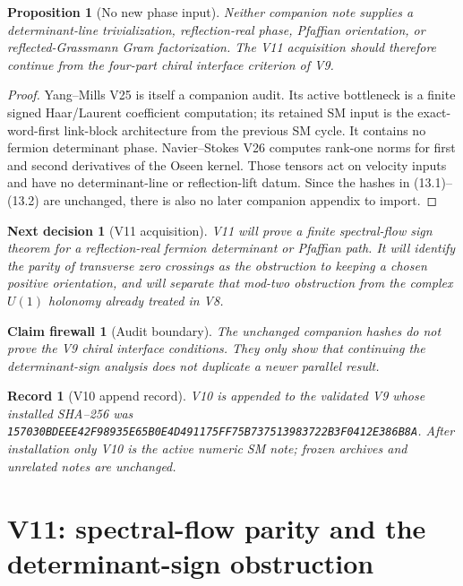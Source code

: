 \documentclass[11pt]{article}
\newtheorem{proposition}[theorem]{Proposition}
\newtheorem{firewall}[theorem]{Claim firewall}
\newtheorem{decision}[theorem]{Next decision}
\newtheorem{record}[theorem]{Record}
\theoremstyle{remark}
\begin{document}
\begin{proposition}[No new phase input]
\label{prop:v19v10-no-input}
Neither companion note supplies a determinant-line trivialization,
reflection-real phase, Pfaffian orientation, or reflected-Grassmann Gram
factorization.  The V11 acquisition should therefore continue from the
four-part chiral interface criterion of V9.
\end{proposition}

\begin{proof}
Yang--Mills V25 is itself a companion audit.  Its active bottleneck is a
finite signed Haar/Laurent coefficient computation; its retained SM input
is the exact-word-first link-block architecture from the previous SM
cycle.  It contains no fermion determinant phase.  Navier--Stokes V26
computes rank-one norms for first and second derivatives of the Oseen
kernel.  Those tensors act on velocity inputs and have no determinant-line
or reflection-lift datum.  Since the hashes in (13.1)--(13.2) are
unchanged, there is also no later companion appendix to import.
\end{proof}

\begin{decision}[V11 acquisition]
\label{dec:v19v10-next}
V11 will prove a finite spectral-flow sign theorem for a reflection-real
fermion determinant or Pfaffian path.  It will identify the parity of
transverse zero crossings as the obstruction to keeping a chosen positive
orientation, and will separate that mod-two obstruction from the complex
\(U(1)\) holonomy already treated in V8.
\end{decision}

\begin{firewall}[Audit boundary]
\label{fire:v19v10}
The unchanged companion hashes do not prove the V9 chiral interface
conditions.  They only show that continuing the determinant-sign analysis
does not duplicate a newer parallel result.
\end{firewall}

\begin{record}[V10 append record]
\label{rec:v19v10}
V10 is appended to the validated V9 whose installed SHA--256 was
\texttt{157030BDEEE42F98935E65B0E4D491175FF75B737513983722B3F0412E386B8A}.
After installation only V10 is the active numeric SM note; frozen archives
and unrelated notes are unchanged.
\end{record}




\section{V11: spectral-flow parity and the determinant-sign obstruction}
\label{sec:v19v11}
\end{document}
